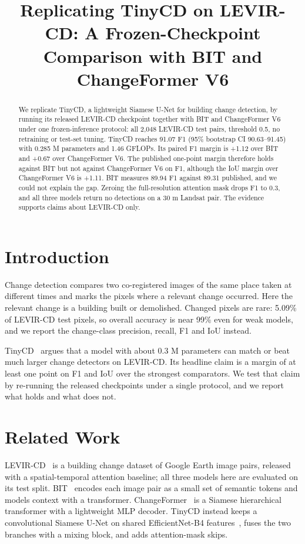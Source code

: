 \documentclass[conference]{IEEEtran}
\title{Replicating TinyCD on LEVIR-CD: A Frozen-Checkpoint Comparison with BIT and ChangeFormer V6}
\author{\IEEEauthorblockN{Shresth Keshari}
\IEEEauthorblockA{IIT Bombay}}
\begin{document}
\maketitle

\begin{abstract}
We replicate TinyCD, a lightweight Siamese U-Net for building change detection, by running its released LEVIR-CD checkpoint together with BIT and ChangeFormer V6 under one frozen-inference protocol: all 2,048 LEVIR-CD test pairs, threshold 0.5, no retraining or test-set tuning. TinyCD reaches 91.07 F1 (95\% bootstrap CI 90.63--91.45) with 0.285 M parameters and 1.46 GFLOPs. Its paired F1 margin is +1.12 over BIT and +0.67 over ChangeFormer V6. The published one-point margin therefore holds against BIT but not against ChangeFormer V6 on F1, although the IoU margin over ChangeFormer V6 is +1.11. BIT measures 89.94 F1 against 89.31 published, and we could not explain the gap. Zeroing the full-resolution attention mask drops F1 to 0.3, and all three models return no detections on a 30 m Landsat pair. The evidence supports claims about LEVIR-CD only.
\end{abstract}

\section{Introduction}
Change detection compares two co-registered images of the same place taken at different times and marks the pixels where a relevant change occurred. Here the relevant change is a building built or demolished. Changed pixels are rare: 5.09\% of LEVIR-CD test pixels, so overall accuracy is near 99\% even for weak models, and we report the change-class precision, recall, F1 and IoU instead.

TinyCD~\cite{codegoni2023tinycd} argues that a model with about 0.3 M parameters can match or beat much larger change detectors on LEVIR-CD. Its headline claim is a margin of at least one point on F1 and IoU over the strongest comparators. We test that claim by re-running the released checkpoints under a single protocol, and we report what holds and what does not.

\section{Related Work}
LEVIR-CD~\cite{chen2020levircd} is a building change dataset of Google Earth image pairs, released with a spatial-temporal attention baseline; all three models here are evaluated on its test split. BIT~\cite{chen2021bit} encodes each image pair as a small set of semantic tokens and models context with a transformer. ChangeFormer~\cite{bandara2022changeformer} is a Siamese hierarchical transformer with a lightweight MLP decoder. TinyCD instead keeps a convolutional Siamese U-Net on shared EfficientNet-B4 features~\cite{tan2019efficientnet}, fuses the two branches with a mixing block, and adds attention-mask skips.
\end{document}
